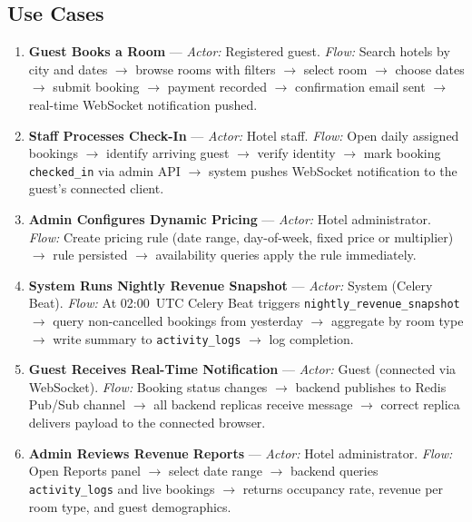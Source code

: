 \documentclass[12pt,a4paper]{article}
\begin{document}
\subsection{Use Cases}

\begin{enumerate}[leftmargin=*, label=\textbf{UC\arabic*.}]

\item \textbf{Guest Books a Room} ---
  \textit{Actor:} Registered guest. \quad
  \textit{Flow:} Search hotels by city and dates $\to$ browse rooms with filters $\to$ select room $\to$ choose dates $\to$ submit booking $\to$ payment recorded $\to$ confirmation email sent $\to$ real-time WebSocket notification pushed.

\item \textbf{Staff Processes Check-In} ---
  \textit{Actor:} Hotel staff. \quad
  \textit{Flow:} Open daily assigned bookings $\to$ identify arriving guest $\to$ verify identity $\to$ mark booking \texttt{checked\_in} via admin API $\to$ system pushes WebSocket notification to the guest's connected client.

\item \textbf{Admin Configures Dynamic Pricing} ---
  \textit{Actor:} Hotel administrator. \quad
  \textit{Flow:} Create pricing rule (date range, day-of-week, fixed price or multiplier) $\to$ rule persisted $\to$ availability queries apply the rule immediately.

\item \textbf{System Runs Nightly Revenue Snapshot} ---
  \textit{Actor:} System (Celery Beat). \quad
  \textit{Flow:} At 02:00~UTC Celery Beat triggers \texttt{nightly\_revenue\_snapshot} $\to$ query non-cancelled bookings from yesterday $\to$ aggregate by room type $\to$ write summary to \texttt{activity\_logs} $\to$ log completion.

\item \textbf{Guest Receives Real-Time Notification} ---
  \textit{Actor:} Guest (connected via WebSocket). \quad
  \textit{Flow:} Booking status changes $\to$ backend publishes to Redis Pub/Sub channel $\to$ all backend replicas receive message $\to$ correct replica delivers payload to the connected browser.

\item \textbf{Admin Reviews Revenue Reports} ---
  \textit{Actor:} Hotel administrator. \quad
  \textit{Flow:} Open Reports panel $\to$ select date range $\to$ backend queries \texttt{activity\_logs} and live bookings $\to$ returns occupancy rate, revenue per room type, and guest demographics.

\end{enumerate}
\end{document}
